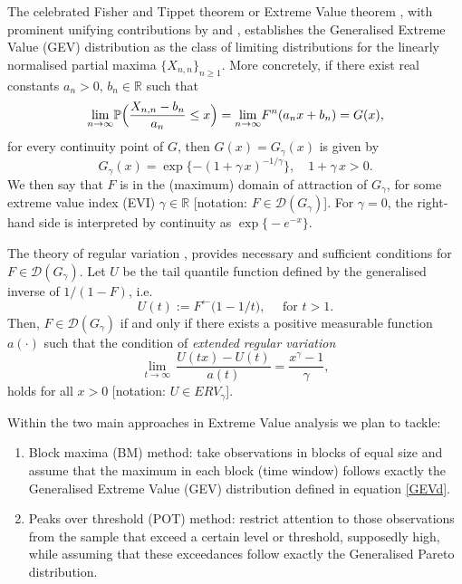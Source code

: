 \documentclass[a4paper]{article}
\newcommand{\field}[1]{\mathbb{#1}}
\newcommand{\real}{\ensuremath{{\field{R}}}}
\newcommand{\mc}[1]{{\ensuremath{\mathcal{#1}}}}
\newcommand{\limit}[1]{\ensuremath{\displaystyle {\lim_{#1 \rightarrow{\infty}}}}}
\begin{document}
The celebrated Fisher and Tippet theorem or Extreme Value theorem \citep{ft28}, with prominent unifying contributions by \cite{Gnedenko:43} and \cite{deHaan:70}, establishes the Generalised Extreme Value (GEV) distribution as the class of limiting distributions for the linearly normalised partial maxima $\{X_{n,n} \}_{n\geq 1}$. More concretely, if there exist real constants $a_n>0$, $b_n \in \real$ such that
\begin{equation}\label{EVTheo}
	\limit{n} \mathbb{P} \Bigl( \frac{X_{n,n}-b_n}{a_n} \leq x\Bigr)= \limit{n} F^n (a_n x + b_n) = G(x),
\end{equation}
for every continuity point of $G$, then $G(x)= G_{\gamma}(x)$ is given by
\begin{equation}\label{GEVd}
	G_{\gamma}(x)= \exp \{ -(1+ \gamma\, x)^{-1/\gamma}\}, \quad 1+\gamma\,x >0.
\end{equation}
We then say that $F$ is in the (maximum) domain of attraction of $G_\gamma$,  for some extreme value index (EVI) $\gamma \in \real$ [notation: $F \in \mathcal{D}(G_{\gamma}) $]. For $\gamma=0$, the right-hand side is interpreted by continuity as $\exp\bigl\{-e^{-x}\bigr\}$. 

The theory of regular variation \citep{Binghametal:87,deHaan:70, deHF:06}, provides necessary and sufficient conditions for $F\in \mc{D}(G_{\gamma})$. Let $U$ be the tail quantile function defined by the generalised inverse of $1/(1-F)$, i.e.
\begin{equation*}
U(t):=   F^{\leftarrow} \bigl( 1-1/t\bigr), \quad \mbox{ for } t>1.
\end{equation*}
Then, $F\in \mc{D}(G_{\gamma})$ if and only if there exists a positive  measurable function $a(\cdot)$ such that the condition of \emph{extended regular variation}
\begin{equation}\label{ERVU}
	\limit{t}\,\frac{U(tx)-U(t)}{a(t)}= \frac{x^{\gamma}-1}{\gamma},
\end{equation}
holds for all $x>0$ [notation: $U\in ERV_{\gamma}$].

Within the two main approaches in Extreme Value analysis we plan to tackle:
\begin{enumerate}
\item\label{BM} Block maxima (BM) method: take observations in blocks of equal size and assume that the maximum in each block (time window) follows exactly the Generalised Extreme Value (GEV) distribution defined in equation \ref{GEVd}.
\item\label{POT} Peaks over threshold (POT) method: restrict attention to those observations from the sample that exceed a certain level or threshold, supposedly high, while assuming that these exceedances follow exactly the Generalised Pareto distribution.	
\end{enumerate}
\end{document}
